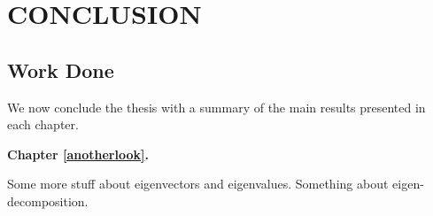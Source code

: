 \chapter{\textbf{CONCLUSION}} \label{Conclude}

\section{Work Done}

We now conclude the thesis with a summary of the main results presented in each chapter.

\textbf{Chapter \ref{anotherlook}.}

\lipsum[1-2]



Some more stuff about eigenvectors and 
eigenvalues. Something about 
eigen-decomposition. 

